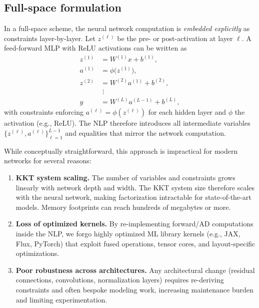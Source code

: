 \documentclass[11pt]{article}
\begin{document}
\subsection{Full-space formulation}
In a full-space scheme, the neural network computation is \emph{embedded explicitly} as constraints layer-by-layer. Let $z^{(\ell)}$ be the pre- or post-activation at layer $\ell$. A feed-forward MLP with ReLU activations can be written as
\begin{align}
  z^{(1)} &= W^{(1)} x + b^{(1)}, \\
  a^{(1)} &= \phi\big(z^{(1)}\big), \\
  z^{(2)} &= W^{(2)} a^{(1)} + b^{(2)}, \\
          &\;\vdots \\
  y &= W^{(L)} a^{(L-1)} + b^{(L)},
\end{align}
with constraints enforcing $a^{(\ell)} = \phi(z^{(\ell)})$ for each hidden layer and $\phi$ the activation (e.g., ReLU). The NLP therefore introduces all intermediate variables $\{z^{(\ell)}, a^{(\ell)}\}_{\ell=1}^{L-1}$ and equalities that mirror the network computation.

While conceptually straightforward, this approach is impractical for modern networks for several reasons:
\begin{enumerate}[leftmargin=1.5em]
  \item \textbf{KKT system scaling.} The number of variables and constraints grows linearly with network depth and width. The KKT system size therefore scales with the neural network, making factorization intractable for state-of-the-art models. Memory footprints can reach hundreds of megabytes or more.
  \item \textbf{Loss of optimized kernels.} By re-implementing forward/AD computations inside the NLP, we forgo highly optimized ML library kernels (e.g., JAX, Flux, PyTorch) that exploit fused operations, tensor cores, and layout-specific optimizations.
  \item \textbf{Poor robustness across architectures.} Any architectural change (residual connections, convolutions, normalization layers) requires re-deriving constraints and often bespoke modeling work, increasing maintenance burden and limiting experimentation.
\end{enumerate}
\end{document}
